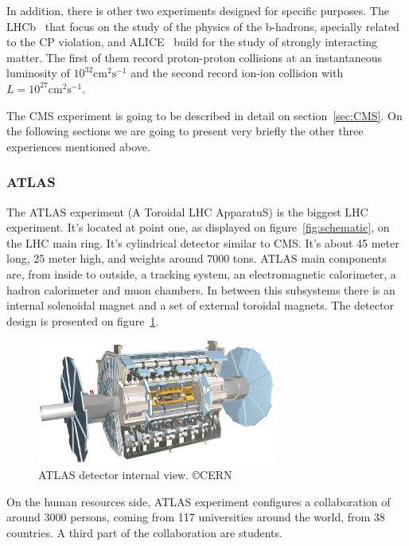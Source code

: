 In addition, there is other two experiments designed for specific purposes. The LHCb~\cite{Alves:2008zz} that focus on the study of the physics of the b-hadrons, specially related to the CP violation, and ALICE~\cite{Cortese:879894} build for the study of strongly interacting matter. The first of them record proton-proton collisions at an instantaneous luminosity of $10^{32}\text{cm}^{2}\text{s}^{-1}$ and the second record ion-ion collision with $L = 10^{27}\text{cm}^{2}\text{s}^{-1}$.

The CMS experiment is going to be described in detail on section~\ref{sec:CMS}. On the following sections we are going to present very briefly the other three experiences mentioned above. 

\subsubsection{ATLAS}
\label{sec:atlas}

The ATLAS experiment (A Toroidal LHC ApparatuS) is the biggest LHC experiment. It's located at point one, as displayed on figure~\ref{fig:schematic}, on the LHC main ring. It's cylindrical detector similar to CMS. It's about 45 meter long, 25 meter high, and weights around 7000 tons. ATLAS main components are, from inside to outside, a tracking system, an electromagnetic calorimeter, a hadron calorimeter and muon chambers. In between this subsystems there is an internal solenoidal magnet and a set of external toroidal magnets. The detector design is presented on figure~\ref{fig:atlasdet}.

\begin{figure}[!Hhtbp]
  \begin{center}
    \includegraphics[width=0.7\textwidth]{figs/atlas_lg.jpg}
    \caption{ATLAS detector internal view. \copyright CERN}
    \label{fig:atlasdet}
  \end{center}
\end{figure}

On the human resources side, ATLAS experiment configures a collaboration of around 3000 persons, coming from 117 universities around the world, from 38 countries. A third part of the collaboration are students.  

